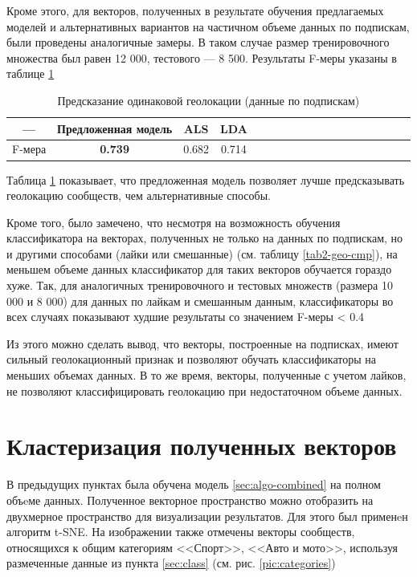 \documentclass[times,specification,annotation]{itmo-student-thesis}
\begin{document}
Кроме этого, для векторов, полученных в результате обучения предлагаемых моделей и альтернативных вариантов на частичном объеме данных по подпискам, были проведены аналогичные замеры. В таком случае размер тренировочного множества был равен 12 000, тестового --- 8 500. Результаты F-меры указаны в таблице \ref{tab2-geo-all}

\begin{table}[!h]
\caption{Предсказание одинаковой геолокации (данные по подпискам)} \label{tab2-geo-all}
\centering
\begin{tabular}{|*{18}{c|}}\hline
---  & Предложенная модель  & ALS & LDA \\\hline
F-мера                        & \textbf{0.739} & 0.682  & 0.714 \\\hline
\end{tabular}
\end{table}

Таблица \ref{tab2-geo-all} показывает, что предложенная модель позволяет лучше предсказывать геолокацию сообществ, чем альтернативные способы. 

Кроме того, было замечено, что несмотря на возможность обучения классификатора на векторах, полученных не только на данных по подпискам, но и другими способами (лайки или смешанные) (см. таблицу \ref{tab2-geo-cmp}), на меньшем объеме данных классификатор для таких векторов обучается гораздо хуже. Так, для аналогичных тренировочного и тестовых множеств (размера 10 000 и 8 000) для данных по лайкам и смешанным данным, классификаторы во всех случаях показывают худшие результаты со значением F-меры < 0.4

Из этого можно сделать вывод, что векторы, построенные на подписках, имеют сильный геолокационный признак и позволяют обучать классификаторы на меньших объемах данных. В то же время, векторы, полученные с учетом лайков, не позволяют классифицировать геолокацию при недостаточном объеме данных.   

\section{Кластеризация полученных векторов}\label{sec:visual}

В предыдущих пунктах была обучена модель \ref{sec:algo-combined} на полном объeме данных. Полученное векторное пространство можно отобразить на двухмерное пространство для визуализации результатов. Для этого был применeн алгоритм t-SNE. На изображении также отмечены векторы сообществ, относящихся к общим категориям <<Спорт>>, <<Авто и мото>>, используя размеченные данные из пункта \ref{sec:class} (см. рис. \ref{pic:categories})
\end{document}
